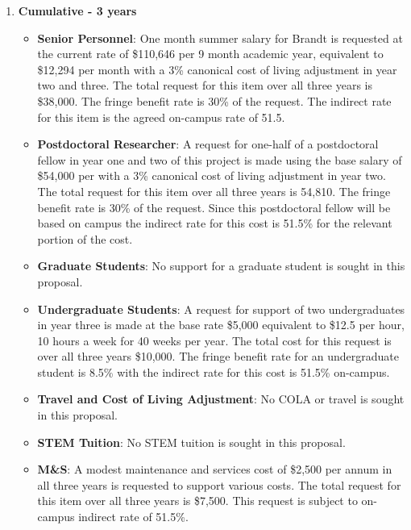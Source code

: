 \begin{enumerate}

\item[]{\textbf{Cumulative - 3 years}}

\begin{itemize}[noitemsep,nolistsep]
\item{{\bf Senior Personnel}: One month summer salary for Brandt is requested at the current rate of \$110,646 per 9 month academic year, equivalent to \$12,294 per month with a 3\% canonical cost of living adjustment in year two and three.  The total request for this item over all three years is \$38,000. The fringe benefit rate is 30\% of the request.  The indirect rate for this item is the agreed on-campus rate of 51.5.}

\item {{\bf Postdoctoral Researcher}: A request for one-half of a postdoctoral fellow in year one and two of this project is made using the base salary of \$54,000 per with a 3\% canonical cost of living adjustment in year two. The total request for this item over all three years is 54,810.  The fringe benefit rate is 30\% of the request.  Since this postdoctoral fellow will be based on campus the indirect rate for this cost is 51.5\% for the relevant portion of the cost. } 

\item{{\bf Graduate Students}: No support for a graduate student is sought in this proposal. }

\item {{\bf Undergraduate Students}: A request for support of two undergraduates in year three  is made at the base rate \$5,000 equivalent to \$12.5 per hour, 10 hours a week for 40 weeks per year.  The total cost for this request is over all three years \$10,000.  The fringe benefit rate for an undergraduate student is 8.5\% with the indirect rate for this cost is 51.5\% on-campus.}

\item{{\bf Travel and Cost of Living Adjustment}: No COLA or travel is sought in this proposal.}

\item {{\bf STEM Tuition}: No STEM tuition is sought in this proposal.}

\item {{\bf M\&S}: A modest maintenance and services cost of \$2,500 per annum in all three years is requested to support various costs. The total request for this item over all three years is \$7,500.  This request is subject to on-campus indirect rate of 51.5\%.}


\end{itemize}
\end{enumerate}
